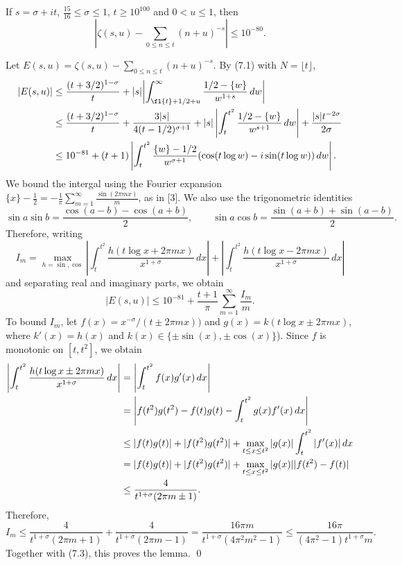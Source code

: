   If $s=\sigma+it$, $\frac{15}{16} \le \sigma \le 1$,
$t \ge 10^{100}$ and $0<u\le 1$, then
$$
\left| \zeta(s,u) - \sum_{0\le n\le t} (n+u)^{-s} \right| \le 10^{-80}.
$$
\endproclaim

  Let $E(s,u) = \zeta(s,u) - \sum_{0\le n\le t} (n+u)^{-s}$.  By
(7.1) with $N=\lfloor t \rfloor$,
$$
\split
|E(s,u)| &\le \frac{(t+3/2)^{1-\sigma}}{t} + |s| \biggl|
\int_{\fl{t}+1/2+u}^{\infty} \frac{1/2-\{w\}}{w^{1+s}}\, dw
\biggr| \\
&\le \frac{(t+3/2)^{1-\sigma}}{t} + \frac{3|s|}{4(t-1/2)^{\sigma+1}}
 + |s| \left| \int_t^{t^2} \frac{1/2 - \{ w \}}{w^{s+1}} \, dw \right|
 + \frac{|s| t^{-2\sigma}}{2\sigma} \\
&\le 10^{-81} + (t+1) \left| \int_t^{t^2} \frac{\{ w \} - 1/2}{w^{\sigma+1}}
(\cos(t\log w)-i\sin(t\log w)) \, dw 
\right|.
\endsplit
$$
We bound the intergal using the Fourier expansion $\{ x \} - \frac12 =
-\frac{1}{\pi} \sum_{m=1}^\infty \frac{\sin(2\pi mx)}{m}$, as in
[3].  We also use the trigonometric identities
$$
\sin a \sin b = \frac{\cos(a-b)-\cos(a+b)}{2}, \qquad
\sin a \cos b = \frac{\sin(a+b)+\sin(a-b)}{2}.
$$
Therefore, writing
$$
I_m = \max_{h=\sin, \cos} 
\left| \int_t^{t^2} \frac{h(t\log x + 2\pi mx)}{x^{1+\sigma}}\, dx \right| + 
\left| \int_t^{t^2} \frac{h(t\log x - 2\pi mx)}{x^{1+\sigma}}\, dx \right|
$$
and separating real and imaginary parts, we obtain
$$
|E(s,u)| \le 10^{-81} + \frac{t+1}{\pi} \sum_{m=1}^\infty \frac{I_m}{m}.
\tag{7.3}
$$
To bound $I_m$, let $f(x) = x^{-\sigma}/(t\pm 2\pi mx))$ and
$g(x) = k(t\log x \pm 2\pi mx)$, where $k'(x)=h(x)$ and
$k(x) \in \{ \pm \sin(x),\pm \cos(x)\}$).   Since $f$ is 
monotonic on $[t,t^2]$, we obtain
$$
\split
\left| \int_t^{t^2} \frac{h(t\log x \pm 2\pi mx)}{x^{1+\sigma}}\, dx \right|
&=\left| \int_t^{t^2} f(x) g'(x)\, dx \right| \\
&= \left| f(t^2)g(t^2)-f(t)g(t) -
\int_t^{t^2} g(x)f'(x)\, dx \right| \\
&\le |f(t)g(t)|+|f(t^2)g(t^2)| + \max_{t\le x\le t^2}
|g(x)| \int_t^{t^2} |f'(x)|\, dx \\
&= |f(t)g(t)|+|f(t^2)g(t^2)| +\max_{t\le x\le t^2}
|g(x)| |f(t^2)-f(t)|  \\
&\le \frac{4}{t^{1+\sigma}(2\pi m \pm 1)}.
\endsplit
$$
Therefore,
$$
I_m \le \frac{4}{t^{1+\sigma}(2\pi m +1)} +
\frac{4}{t^{1+\sigma}(2\pi m -1)} = \frac{16\pi m}{t^{1+\sigma} (4\pi^2
m^2-1)} \le \frac{16\pi}{(4\pi^2-1) t^{1+\sigma} m}.
$$
Together with (7.3), this proves the lemma.
\qed\enddemo


